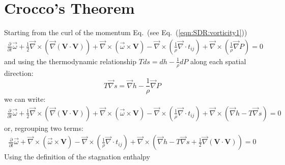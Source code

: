 \documentclass{warpdoc}
\newcommand{\mfd}{\displaystyle}
\begin{document}
\section{Crocco's Theorem}


Starting from the curl of the momentum Eq.\ (see Eq.\ (\ref{eqn:SDR:vorticity1}))
%
\begin{equation}
 \label{eqn:Crocco:vorticity1}
 \begin{array}{r}
  \mfd\frac{\partial}{\partial t} \vec{\omega}
      + \frac{1}{2} \vec{\nabla} \times \left( \vec{\nabla} \left( \bm{V} \cdot \bm{V} \right)\right)
       +\vec{\nabla} \times \left(\vec{\omega} \times \bm{V}\right)
      - \vec{\nabla} \times \left( \frac{1}{\rho} \vec{\nabla} \cdot t_{ij} \right)
      + \vec{\nabla} \times \left( \frac{1}{\rho} \vec{\nabla} P \right)
      = 0
 \end{array}
\end{equation}
%
and using the thermodynamic relationship $T ds=dh - \frac{1}{\rho} dP$
along each spatial direction:
%
\begin{equation}
  \label{eqn:Crocco:Tds}
  T \vec{\nabla} s = \vec{\nabla} h - \frac{1}{\rho} \vec{\nabla} P
\end{equation}
%
we can write:
%
\begin{equation}
 \label{eqn:Crocco:vorticity2}
 \begin{array}{r}
  \mfd\frac{\partial}{\partial t} \vec{\omega}
      + \frac{1}{2} \vec{\nabla} \times \left( \vec{\nabla} \left( \bm{V} \cdot \bm{V} \right)\right)
       +\vec{\nabla} \times \left(\vec{\omega} \times \bm{V}\right)
      - \vec{\nabla} \times \left( \frac{1}{\rho} \vec{\nabla} \cdot t_{ij} \right)
      + \vec{\nabla} \times \left( \vec{\nabla} h - T \vec{\nabla} s\right)
      = 0
 \end{array}
\end{equation}
%
or, regrouping two terms:
%
\begin{equation}
 \label{eqn:Crocco:vorticity3}
 \begin{array}{r}
  \mfd\frac{\partial}{\partial t} \vec{\omega}
       +\vec{\nabla} \times \left(\vec{\omega} \times \bm{V}\right)
      - \vec{\nabla} \times \left( \frac{1}{\rho} \vec{\nabla} \cdot t_{ij} \right)
      + \vec{\nabla} \times \left( \vec{\nabla} h - T \vec{\nabla} s
           +\frac{1}{2}\vec{\nabla} \left( \bm{V} \cdot \bm{V} \right) \right)
      = 0
 \end{array}
\end{equation}
%
Using the definition of the stagnation enthalpy
\end{document}
